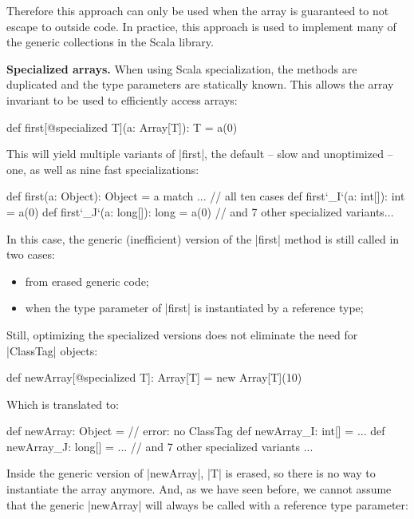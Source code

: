 Therefore this approach can only be used when the array is guaranteed to not escape to outside code. In practice, this approach is used to implement many of the generic collections in the Scala library.

\textbf{Specialized arrays.} When using Scala specialization, the methods are duplicated and the type parameters are statically known. This allows the array invariant to be used to efficiently access arrays:

\begin{lstlisting-nobreak}
 def first[@specialized T](a: Array[T]): T = a(0)
\end{lstlisting-nobreak}

This will yield multiple variants of |first|, the default -- slow and unoptimized -- one, as well as nine fast specializations:

\begin{lstlisting-nobreak}
 def first(a: Object): Object =
   a match {
     ... // all ten cases
   }
 def first`_I`(a: int[]): int = a(0)
 def first`_J`(a: long[]): long = a(0)
 // and 7 other specialized variants...
\end{lstlisting-nobreak}

In this case, the generic (inefficient) version of the |first| method is still called in two cases:
\begin{itemize}
  \item from erased generic code;
  \item when the type parameter of |first| is instantiated by a reference type;
\end{itemize}

Still, optimizing the specialized versions does not eliminate the need for |ClassTag| objects:

\begin{lstlisting-nobreak}
 def newArray[@specialized T]: Array[T] =
   new Array[T](10)
\end{lstlisting-nobreak}

Which is translated to:

\begin{lstlisting-nobreak}
 def newArray: Object = // error: no ClassTag
 def newArray_I: int[] = ...
 def newArray_J: long[] = ...
 // and 7 other specialized variants ...
\end{lstlisting-nobreak}

Inside the generic version of |newArray|, |T| is erased, so there is no way to instantiate the array anymore. And, as we have seen before, we cannot assume that the generic |newArray| will always be called with a reference type parameter:

